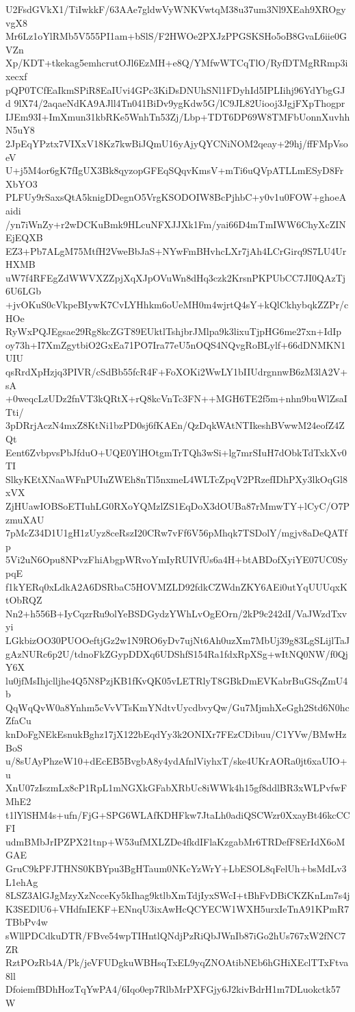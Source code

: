 U2FsdGVkX1/TiIwkkF/63AAe7gldwVyWNKVwtqM38u37um3Nl9XEah9XROgyvgX8
Mr6Lz1oYlRMb5V555PI1am+bSlS/F2HWOe2PXJzPPGSKSHo5oB8GvaL6iie0GVZn
Xp/KDT+tkekag5emhcrutOJl6EzMH+e8Q/YMfwWTCqTlO/RyfDTMgRRmp3ixecxf
pQP0TCfEaIkmSPiR8EaIUvi4GPc3KiDsDNUhSNl1FDyhId5IPLIihj96YdYbgGJd
9lX74/2aqaeNdKA9AJll4Tn041BiDv9ygKdw5G/lC9JL82Uiooj3JgjFXpThogpr
IJEm93I+ImXmun31kbRKe5WnhTn53Zj/Lbp+TDT6DP69W8TMFbUonnXuvhhN5uY8
2JpEqYPztx7VIXxV18Kz7kwBiJQmU16yAjyQYCNiNOM2qeay+29hj/ffFMpVsoeV
U+j5M4or6gK7fIgUX3Bk8qyzopGFEqSQqvKmsV+mTi6uQVpATLLmESyD8FrXbYO3
PLFUy9rSaxsQtA5knigDDegnO5VrgKSODOIW8BcPjhbC+y0v1u0FOW+ghoeAaidi
/yn7iWnZy+r2wDCKuBmk9HLcuNFXJJXk1Fm/yai66D4mTmIWW6ChyXcZINEjEQXB
EZ3+Pb7ALgM75MtfH2VweBbJaS+NYwFmBHvhcLXr7jAh4LCrGirq9S7LU4UrHXMB
uW7f4RFEgZdWWVXZZpjXqXJpOVuWn8dHq3czk2KrsnPKPUbCC7JI0QAzTj6U6LGb
+jvOKuS0cVkpeBIywK7CvLYHhkm6oUeMH0m4wjrtQ4sY+kQlCkhybqkZZPr/cHOe
RyWxPQJEgsae29Rg8kcZGT89EUktlTshjbrJMlpa9k3lixuTjpHG6me27xn+IdIp
oy73h+I7XmZgytbiO2GxEa71PO7Ira77eU5nOQS4NQvgRoBLylf+66dDNMKN1UIU
qsRrdXpHzjq3PIVR/cSdBb55fcR4F+FoXOKi2WwLY1bIIUdrgnnwB6zM3lA2V+sA
+0weqcLzUDz2fnVT3kQRtX+rQ8kcVnTc3FN++MGH6TE2f5m+nhn9buWlZsaITti/
3pDRrjAczN4mxZ8KtNi1bzPD0sj6fKAEn/QzDqkWAtNTIkeshBVwwM24eofZ4ZQt
Eent6ZvbpvsPbJfduO+UQE0YlHOtgmTrTQh3wSi+lg7mrSIuH7dObkTdTxkXv0TI
SlkyKEtXNaaWFnPUIuZWEh8nTl5nxmeL4WLTcZpqV2PRzefIDhPXy3lkOqGl8xVX
ZjHUawIOBSoETIuhLG0RXoYQMzlZS1EqDoX3dOUBa87rMmwTY+lCyC/O7PzmuXAU
7pMcZ34D1U1gH1zUyz8ceRszI20CRw7vFf6V56pMhqk7TSDolY/mgjv8aDeQATfp
5Vi2uN6Opu8NPvzFhiAbgpWRvoYmIyRUIVfUs6a4H+btABDofXyiYE07UC0SypqE
f1kYERq0xLdkA2A6DSRbaC5HOVMZLD92fdkCZWdnZKY6AEi0utYqUUUqxKtObRQZ
Nn2+h556B+IyCqzrRu9olYeBSDGydzYWhLvOgEOrn/2kP9c242dI/VaJWzdTxvyi
LGkbizOO30PUOOeftjGz2w1N9RO6yDv7ujNt6Ah0uzXm7MbUj39g83LgSLijlTaJ
gAzNURc6p2U/tdnoFkZGypDDXq6UDShfS154Ra1fdxRpXSg+wItNQ0NW/f0QjY6X
lu0jfMsIhjclljhe4Q5N8PzjKB1fKvQK05vLETRlyT8GBkDmEVKabrBuGSqZmU4b
QqWqQvW0a8Ynhm5cVvVTsKmYNdtvUycdbvyQw/Gu7MjmhXeGgh2Std6N0hcZfaCu
knDoFgNEkEsnukBghz17jX122bEqdYy3k2ONIXr7FEzCDibuu/C1YVw/BMwHzBoS
u/8sUAyPhzeW10+dEcEB5BvgbA8y4ydAfnlViyhxT/ske4UKrAORa0jt6xaUIO+u
XnU07zIszmLx8cP1RpL1mNGXkGFabXRbUc8iWWk4h15gf8ddlBR3xWLPvfwFMhE2
t1lYlSHM4s+ufn/FjG+SPG6WLAfKDHFkw7JtaLh0adiQSCWzr0XxayBt46kcCCFI
udmBMbJrIPZPX21tnp+W53ufMXLZDe4fkdIFlaKzgabMr6TRDefF8ErIdX6oMGAE
GruC9kPFJTHNS0KBYpu3BgHTaum0NKcYzWrY+LbESOL8qFelUh+bsMdLv3L1ehAg
8LSZ3AlGJgMzyXzNcceKy5kIhag9ktlbXmTdjIyxSWcI+tBhFvDBiCKZKnLm7s4j
K3SEDlU6+VHdfnIEKF+ENnqU3ixAwHcQCYECW1WXH5urxIeTnA91KPmR7TBbPv4w
sWllPDCdkuDTR/FBve54wpTIHntlQNdjPzRiQbJWnIb87iGo2hUs767xW2fNC7ZR
RztPOzRb4A/Pk/jeVFUDgkuWBHsqTxEL9yqZNOAtibNEb6hGHiXEclTTxFtva8ll
DfoiemfBDhHozTqYwPA4/6Iqo0ep7RlbMrPXFGjy6J2kivBdrH1m7DLuokctk57W
